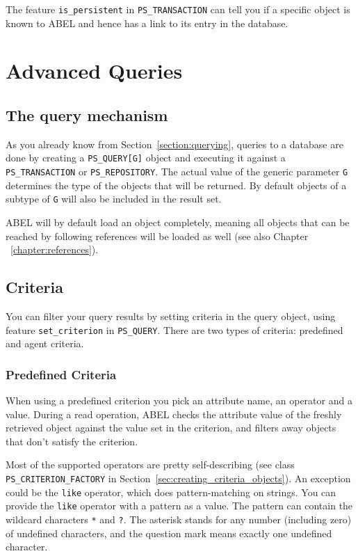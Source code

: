 \documentclass[a4paper,12pt]{report}
\begin{document}
The feature \lstinline{is_persistent} in \lstinline!PS_TRANSACTION! can tell you if a specific object is known to ABEL and hence has a link to its entry in the database.

\chapter{Advanced Queries}
\label{sec:advanced_queries}

\section{The query mechanism}

As you already know from Section~\ref{section:querying}, queries to a database are done by creating a \lstinline!PS_QUERY[G]! object 
and executing it against a \lstinline!PS_TRANSACTION! or \lstinline!PS_REPOSITORY!.
The actual value of the generic parameter \lstinline!G! determines the type of the objects that will be returned.
By default objects of a subtype of \lstinline!G! will also be included in the result set.

ABEL will by default load an object completely, meaning all objects that can be reached by following references will be loaded as well (see also Chapter ~\ref{chapter:references}).

\section{Criteria}

You can filter your query results by setting criteria in the query object, using feature \lstinline{set_criterion} in \lstinline{PS_QUERY}.
There are two types of criteria: predefined and agent criteria.

\subsection{Predefined Criteria}
When using a predefined criterion you pick an attribute name, an operator and a value. 
During a read operation, ABEL checks the attribute value of the freshly retrieved object against the value set in the criterion, and filters away objects that don't satisfy the criterion.

Most of the supported operators are pretty self-describing (see class \lstinline{PS_CRITERION_FACTORY} in Section~\ref{sec:creating_criteria_objects}).
An exception could be the \lstinline!like! operator, which does pattern-matching on strings.
You can provide the \lstinline!like! operator with a pattern as a value. The pattern can contain the wildcard characters \lstinline!*! and \lstinline!?!.
The asterisk stands for any number (including zero) of undefined characters, and the question mark means exactly one undefined character.
\end{document}
